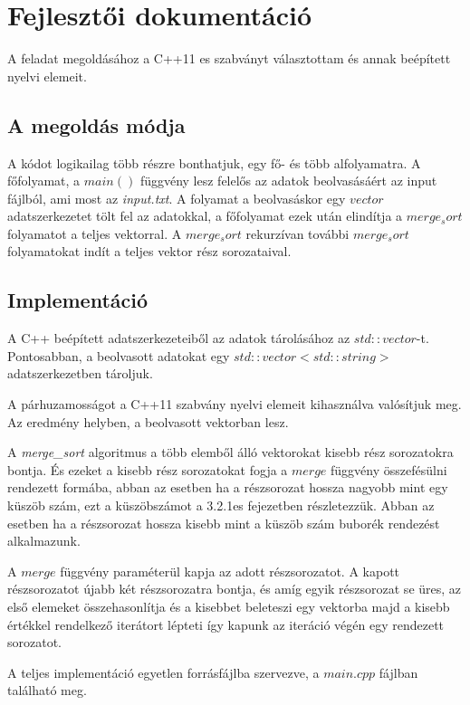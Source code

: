\documentclass{article}
\begin{document}
\section{Fejlesztői dokumentáció}
\begin{itshape}
A feladat megoldásához a C++11 es szabványt választottam és annak beépített nyelvi elemeit. \\
\end{itshape}

\subsection{A megoldás módja}
A kódot logikailag több részre bonthatjuk, egy fő- és több alfolyamatra. A főfolyamat, a $main()$ függvény lesz felelős az adatok beolvasásáért az input fájlból, ami most az \textit{input.txt}. A folyamat a beolvasáskor egy $vector$ adatszerkezetet tölt fel az adatokkal, a főfolyamat ezek után elindítja a $merge_sort$ folyamatot a teljes vektorral. A $merge_sort$ rekurzívan további $merge_sort$ folyamatokat indít a teljes vektor rész sorozataival.
\subsection{Implementáció}
A C++ beépített adatszerkezeteiből  az adatok tárolásához az $std::vector$-t. Pontosabban, a beolvasott adatokat egy $std::vector<std::string>$ adatszerkezetben tároljuk.

A párhuzamosságot a C++11 szabvány nyelvi elemeit kihasználva valósítjuk meg. Az eredmény helyben, a beolvasott vektorban lesz.

A \textit{merge\_sort} algoritmus a több elemből álló vektorokat kisebb rész sorozatokra bontja. És ezeket a kisebb rész sorozatokat fogja a $merge$ függvény összefésülni rendezett formába, abban az esetben ha a részsorozat hossza nagyobb mint egy küszöb szám, ezt a küszöbszámot a 3.2.1es fejezetben részletezzük. Abban az esetben ha a részsorozat hossza kisebb mint a küszöb szám buborék rendezést alkalmazunk.

A $merge$ függvény paraméterül kapja az adott részsorozatot. A kapott részsorozatot újabb két részsorozatra bontja, és amíg egyik részsorozat se üres, az első elemeket összehasonlítja és a kisebbet beleteszi egy vektorba majd a kisebb értékkel rendelkező iterátort lépteti így kapunk az iteráció végén egy rendezett sorozatot.

A teljes implementáció egyetlen forrásfájlba szervezve, a $main.cpp$ fájlban található meg.
\newpage
\end{document}

